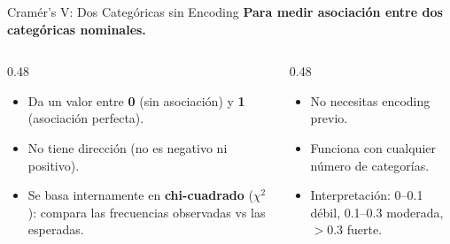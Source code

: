 \documentclass[aspectratio=169, 11pt]{beamer}
\begin{document}
\begin{frame}[shrink=5]{Cramér's V: Dos Categóricas sin Encoding}
  \vspace{-4pt}
  {\footnotesize\color{arcaDark}\bfseries
    Para medir asociación entre dos categóricas nominales.}

  \vspace{6pt}
  \begin{columns}[T]
    \begin{column}{0.48\textwidth}
      {\scriptsize
      \begin{itemize}\setlength{\itemsep}{5pt}
        \item[{\color{arcaRed}\faArrowRight}]
          Da un valor entre \textbf{0} (sin asociación) y
          \textbf{1} (asociación perfecta).
        \item[{\color{arcaRed}\faArrowRight}]
          No tiene dirección (no es negativo ni positivo).
        \item[{\color{arcaRed}\faArrowRight}]
          Se basa internamente en \textbf{chi-cuadrado} ($\chi^2$):
          compara las frecuencias observadas vs las esperadas.
      \end{itemize}
      }
    \end{column}

    \begin{column}{0.48\textwidth}
      {\scriptsize
      \begin{itemize}\setlength{\itemsep}{5pt}
        \item[{\color{codeGreen}\faCheckCircle}]
          No necesitas encoding previo.
        \item[{\color{codeGreen}\faCheckCircle}]
          Funciona con cualquier número de categorías.
        \item[{\color{codeGreen}\faCheckCircle}]
          Interpretación: 0--0.1 débil, 0.1--0.3 moderada,
          $>0.3$ fuerte.
      \end{itemize}
      }
    \end{column}
  \end{columns}
\end{frame}
\end{document}

